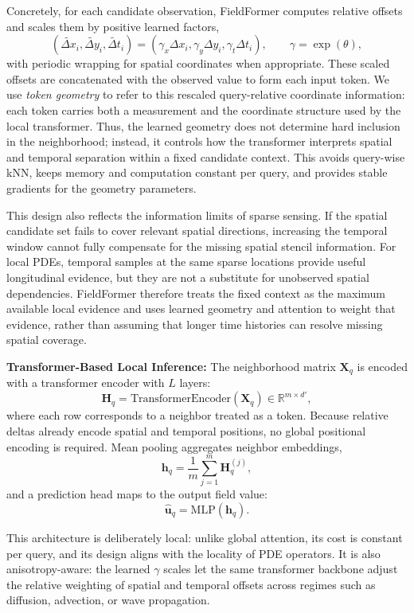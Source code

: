 Concretely, for each candidate observation, FieldFormer computes relative offsets and scales them by positive learned factors,
\[
(\widetilde{\Delta x}_i,\widetilde{\Delta y}_i,\widetilde{\Delta t}_i)
=
(\gamma_x \Delta x_i,\gamma_y \Delta y_i,\gamma_t \Delta t_i),
\qquad
\gamma=\exp(\theta),
\]
with periodic wrapping for spatial coordinates when appropriate. These scaled offsets are concatenated with the observed value to form each input token. We use \emph{token geometry} to refer to this rescaled query-relative coordinate information: each token carries both a measurement and the coordinate structure used by the local transformer. Thus, the learned geometry does not determine hard inclusion in the neighborhood; instead, it controls how the transformer interprets spatial and temporal separation within a fixed candidate context. This avoids query-wise kNN, keeps memory and computation constant per query, and provides stable gradients for the geometry parameters.

This design also reflects the information limits of sparse sensing. If the spatial candidate set fails to cover relevant spatial directions, increasing the temporal window cannot fully compensate for the missing spatial stencil information. For local PDEs, temporal samples at the same sparse locations provide useful longitudinal evidence, but they are not a substitute for unobserved spatial dependencies. FieldFormer therefore treats the fixed context as the maximum available local evidence and uses learned geometry and attention to weight that evidence, rather than assuming that longer time histories can resolve missing spatial coverage.

\noindent\textbf{Transformer-Based Local Inference:}  
The neighborhood matrix $\mathbf{X}_q$ is encoded with a transformer encoder with $L$ layers:
\[
\mathbf{H}_q = \text{TransformerEncoder}(\mathbf{X}_q) \in \mathbb{R}^{m \times d'},
\]
where each row corresponds to a neighbor treated as a token. Because relative deltas already encode spatial and temporal positions, no global positional encoding is required. Mean pooling aggregates neighbor embeddings,
\[
\mathbf{h}_q = \frac{1}{m} \sum_{j=1}^m \mathbf{H}_q^{(j)},
\]
and a prediction head maps to the output field value:
\[
\hat{\mathbf{u}}_q = \text{MLP}(\mathbf{h}_q).
\]

This architecture is deliberately local: unlike global attention, its cost is constant per query, and its design aligns with the locality of PDE operators. It is also anisotropy-aware: the learned $\gamma$ scales let the same transformer backbone adjust the relative weighting of spatial and temporal offsets across regimes such as diffusion, advection, or wave propagation.

